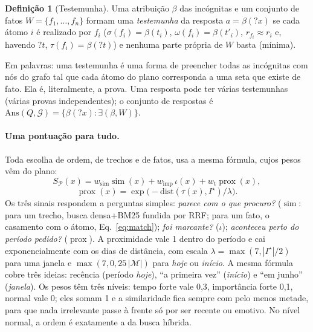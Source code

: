 \documentclass[10pt,twocolumn]{article}
\theoremstyle{definition}
\newtheorem{definicao}{Definição}
\newcommand{\V}[1]{\mathord{?}\mathit{#1}}
\newcommand{\M}{\mathcal{M}}
\newcommand{\G}{\mathcal{G}}
\newcommand{\Pl}{\mathcal{P}}
\newcommand{\sem}{\operatorname{sim}}
\newcommand{\prox}{\operatorname{prox}}
\begin{document}
\begin{definicao}[Testemunha]
Uma atribuição $\beta$ das incógnitas e um conjunto de fatos
$W=\{f_1,\dots,f_n\}$ formam uma \emph{testemunha} da resposta
$a=\beta(\V x)$ se cada átomo $i$ é realizado por $f_i$
($\sigma(f_i)=\beta(t_i)$, $\omega(f_i)=\beta(t'_i)$,
$r_{f_i}\approx r_i$ e, havendo $\V t$, $\tau(f_i)=\beta(\V t)$) e nenhuma
parte própria de $W$ basta (mínima).
\end{definicao}

Em palavras: uma testemunha é uma forma de preencher todas as incógnitas com
nós do grafo tal que cada átomo do plano corresponda a uma seta que existe de
fato. Ela é, literalmente, a prova. Uma resposta pode ter várias
testemunhas (várias provas independentes); o conjunto de respostas é
$\mathrm{Ans}(Q,\G)=\{\beta(\V x):\exists(\beta,W)\}$.

\paragraph{Uma pontuação para tudo.} Toda escolha de ordem, de trechos e de
fatos, usa a mesma fórmula, cujos pesos vêm do plano:
\begin{equation}\label{eq:score}
S_{\Pl}(x)=w_{\text{sim}}\sem(x)+w_{\text{imp}}\,\iota(x)+w_{\text{t}}\prox(x),
\end{equation}
\begin{equation}\label{eq:prox}
\prox(x)=\exp\!\big(-\mathrm{dist}(\tau(x),I^\star)/\lambda\big).
\end{equation}
Os três sinais respondem a perguntas simples: \emph{parece com o que procuro?}
($\sem$: para um trecho, busca densa+BM25 fundida por RRF; para um fato, o
casamento com o átomo, Eq.~\ref{eq:match}); \emph{foi marcante?} ($\iota$);
\emph{aconteceu perto do período pedido?} ($\prox$). A proximidade vale 1
dentro do período e cai exponencialmente com os dias de distância, com escala
$\lambda=\max(7,|I^\star|/2)$ para uma janela e $\max(7,0{,}25\,|\M|)$ para
\emph{hoje} ou \emph{início}. A mesma fórmula cobre três ideias: recência
(período \emph{hoje}), ``a primeira vez'' (\emph{início}) e ``em junho''
(\emph{janela}). Os pesos têm três níveis: tempo forte vale 0{,}3,
importância forte 0{,}1, normal vale 0; eles somam 1 e a similaridade fica
sempre com pelo menos metade, para que nada irrelevante passe à frente só por
ser recente ou emotivo. No nível normal, a ordem é exatamente a da busca
híbrida.

\end{document}
